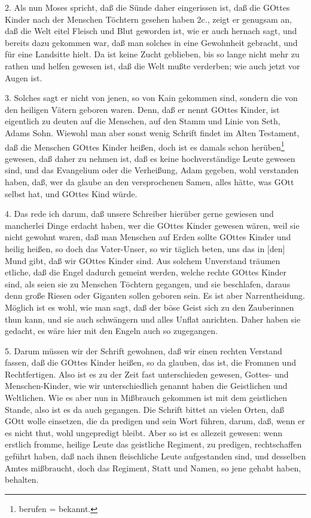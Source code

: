 2. Als nun Moses spricht, daß die Sünde daher eingerissen ist, daß die GOttes Kinder nach der Menschen Töchtern gesehen haben 2c., zeigt er genugsam an, daß die Welt eitel Fleisch und Blut geworden ist, wie er auch hernach sagt, und bereits dazu gekommen war, daß man solches in eine Gewohnheit gebracht, und für eine Landsitte hielt. Da ist keine Zucht geblieben, bis so lange nicht mehr zu rathen und helfen gewesen ist, daß die Welt mußte verderben; wie auch jetzt vor Augen ist.

3. Solches sagt er nicht von jenen, so von Kain gekommen sind, sondern die von den heiligen Vätern geboren waren. Denn, daß er nennt GOttes Kinder, ist eigentlich zu deuten auf die Menschen, auf den Stamm und Linie von Seth, Adams Sohn. Wiewohl man aber sonst wenig Schrift findet im Alten Testament, daß die Menschen GOttes Kinder heißen, doch ist es damals schon herüben\footnote{berufen = bekannt.} gewesen, daß daher zu nehmen ist, daß es keine hochverständige Leute gewesen sind, und das Evangelium oder die Verheißung, Adam gegeben, wohl verstanden haben, daß, wer da glaube an den versprochenen Samen, alles hätte, was GOtt selbst hat, und GOttes Kind würde.

4. Das rede ich darum, daß unsere Schreiber hierüber gerne gewiesen und mancherlei Dinge erdacht haben, wer die GOttes Kinder gewesen wären, weil sie nicht gewohnt waren, daß man Menschen auf Erden sollte GOttes Kinder und heilig heißen, so doch das Vater-Unser, so wir täglich beten, uns das in [den] Mund gibt, daß wir GOttes Kinder sind. Aus solchem Unverstand träumen etliche, daß die Engel dadurch gemeint werden, welche rechte GOttes Kinder sind, als seien sie zu Menschen Töchtern gegangen, und sie beschlafen, daraus denn große Riesen oder Giganten sollen geboren sein. Es ist aber Narrentheidung. Möglich ist es wohl, wie man sagt, daß der böse Geist sich zu den Zauberinnen thun kann, und sie auch schwängern und alles Unflat anrichten. Daher haben sie gedacht, es wäre hier mit den Engeln auch so zugegangen.

5. Darum müssen wir der Schrift gewohnen, daß wir einen rechten Verstand fassen, daß die GOttes Kinder heißen, so da glauben, das ist, die Frommen und Rechtfertigen. Also ist es zu der Zeit fast unterschieden gewesen, Gottes- und Menschen-Kinder, wie wir unterschiedlich genannt haben die Geistlichen und Weltlichen. Wie es aber nun in Mißbrauch gekommen ist mit dem geistlichen Stande, also ist es da auch gegangen. Die Schrift bittet an vielen Orten, daß GOtt wolle einsetzen, die da predigen und sein Wort führen, darum, daß, wenn er es nicht thut, wohl ungepredigt bleibt. Aber so ist es allezeit gewesen: wenn erstlich fromme, heilige Leute das geistliche Regiment, zu predigen, rechtschaffen geführt haben, daß nach ihnen fleischliche Leute aufgestanden sind, und desselben Amtes mißbraucht, doch das Regiment, Statt und Namen, so jene gehabt haben, behalten.

